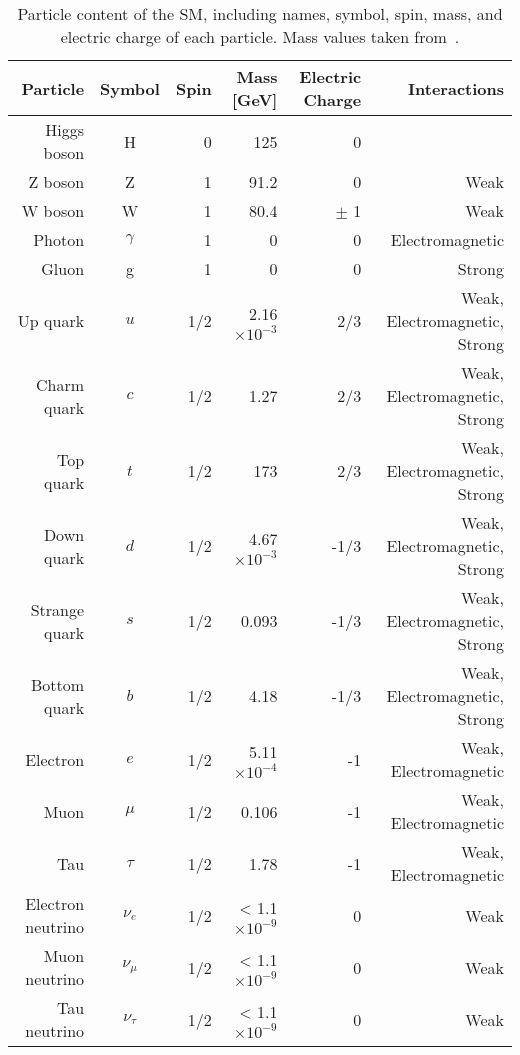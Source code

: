 \begin{table} [htbp!]
    \centering
    \caption{Particle content of the SM, including names, symbol, spin, mass, and electric charge of each particle. Mass values taken from~\cite{Zyla:2020zbs}.}
    \begin{tabular}{ r c r r r r} \hline \hline
        Particle & Symbol & Spin & Mass [GeV] & Electric Charge & Interactions\\ \hline 
        Higgs boson & H & 0 & 125 & 0 & \\ \hline
        Z boson & Z & 1 & 91.2 & 0 & Weak \\ 
        W boson & W & 1 & 80.4 & $\pm$ 1 & Weak\\
        Photon & $\gamma$ & 1 & 0 & 0 & Electromagnetic\\
        Gluon & g & 1 & 0 & 0 & Strong \\ \hline
        Up quark & $u$ & 1/2 & 2.16 $\times 10^{-3}$ & 2/3 & Weak, Electromagnetic, Strong \\
        Charm quark & $c$ & 1/2 & 1.27 & 2/3 & Weak, Electromagnetic, Strong \\
        Top quark & $t$ & 1/2 & 173 & 2/3 & Weak, Electromagnetic, Strong \\
        Down quark & $d$ & 1/2 & 4.67 $\times 10^{-3}$ & -1/3 & Weak, Electromagnetic, Strong \\
        Strange quark & $s$ & 1/2 & 0.093 & -1/3 & Weak, Electromagnetic, Strong \\
        Bottom quark & $b$ & 1/2 & 4.18 & -1/3 & Weak, Electromagnetic, Strong \\ \hline
        Electron & $e$ & 1/2 & 5.11 $\times 10^{-4}$  & -1 & Weak, Electromagnetic \\
        Muon & $\mu$ & 1/2 & 0.106 & -1 & Weak, Electromagnetic\\
        Tau & $\tau$ & 1/2 & 1.78 & -1 & Weak, Electromagnetic\\
        Electron neutrino & $\nu_e$ & 1/2 & < 1.1 $\times 10^{-9}$ & 0 & Weak \\
        Muon neutrino & $\nu_\mu$ & 1/2 & < 1.1 $\times 10^{-9}$ & 0 & Weak \\
        Tau neutrino & $\nu_\tau$ & 1/2 & < 1.1 $\times 10^{-9}$ & 0 & Weak\\ \hline \hline
    \end{tabular}
    \label{tab:sm_particles}
\end{table}

